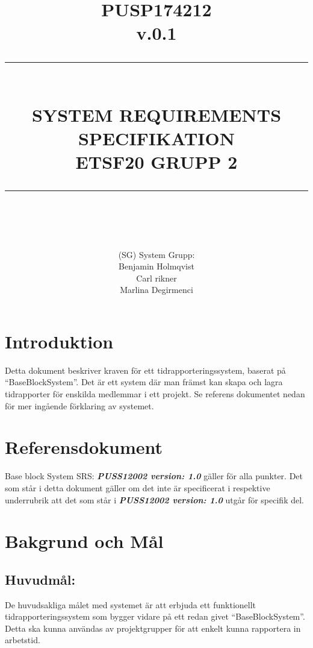 \documentclass[paper=a4, fontsize=11pt,twoside]{article}
\title{ 														%
		\documentNumber{#1}											%
		\documentVersion{#2}											%
		\HRule{0.5pt} \\ %
		\LARGE \textbf{\uppercase{#3}} \\  									%
		\large \textbf{\uppercase{ETSF20 Grupp 2}}							%
		\HRule{2pt} \\ [0.5cm]      	%
		\normalsize          		%
	}															%
\author{#4}													%
\date{}                                           	%
\newcommand{\HRule}[1]{\rule{\linewidth}{#1}}   							%
\newcommand{\documentNumber}[1]{\centering PUSP1742#1 \\[1.0cm]}	 		%
\newcommand{\documentVersion}[1]{\centering \small{v.#1} \\[1.0cm]}	 		%
\newcommand{\grouptitlepage}[4]{										%
	\title{ 														%
		\documentNumber{#1}											%
		\documentVersion{#2}											%
		\HRule{0.5pt} \\ %
		\LARGE \textbf{\uppercase{#3}} \\  									%
		\large \textbf{\uppercase{ETSF20 Grupp 2}}							%
		\HRule{2pt} \\ [0.5cm]      	%
		\normalsize          		%
	}															%
	\author{#4}													%
	\maketitle														%
	\tableofcontents												%
	\thispagestyle{empty} 											%
	\newpage														%
}																%
\begin{document}
	
	\grouptitlepage
	{12	}
	{0.1}
	{System Requirements Specifikation}
	{(SG) System Grupp: \\ Benjamin Holmqvist \\ Carl rikner \\Marlina Degirmenci}	
	\section{Introduktion}
	Detta dokument beskriver kraven för ett tidrapporteringssystem, baserat på “BaseBlockSystem”. Det är ett system där man främst kan skapa och lagra tidrapporter för enskilda medlemmar i ett projekt. Se referens dokumentet nedan för mer ingående förklaring av systemet.
	\section{Referensdokument}
	Base block System SRS: \textbf{\textit{PUSS12002 version: 1.0}}  gäller för alla punkter. Det som står i detta dokument gäller om det inte är specificerat i respektive underrubrik att det som står i \textbf{\textit{PUSS12002 version: 1.0}}  utgår för specifik del.
	
	\section{Bakgrund och Mål}
	
	\subsection{Huvudmål:}
	De huvudsakliga målet med systemet är att erbjuda ett funktionellt tidrapporteringssystem som bygger vidare på ett redan givet “BaseBlockSystem”. Detta ska kunna användas av projektgrupper för att enkelt kunna rapportera in arbetstid.
\end{document}
